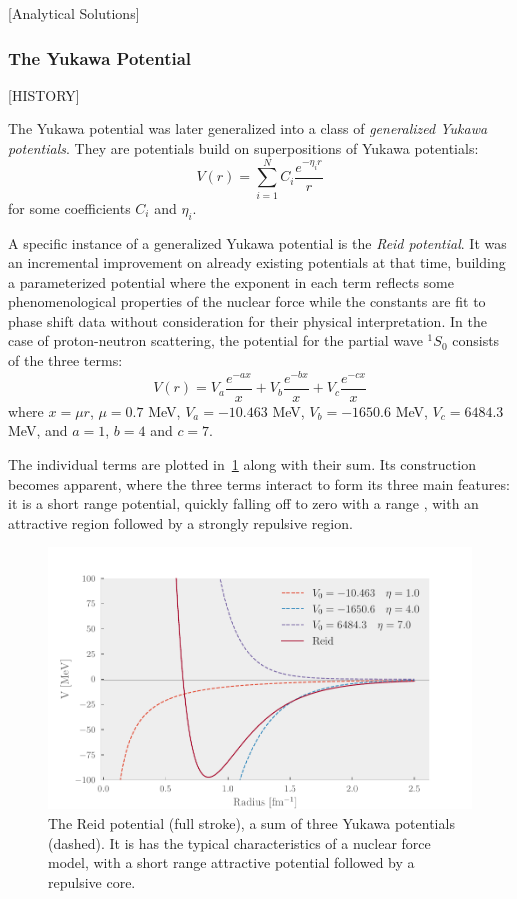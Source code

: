 [Analytical Solutions]


\subsubsection{The Yukawa Potential}
[HISTORY]

The Yukawa potential was later generalized into a class of \textit{generalized
  Yukawa potentials}. They are potentials build on superpositions of Yukawa potentials:
\begin{equation*}
  V(r) = \sum_{i=1}^{N}C_{i}\frac{e^{-\eta_{i}r}}{r}
\end{equation*}
for some coefficients \(C_{i}\) and \(\eta_{i}\).

A specific instance of a generalized Yukawa potential is the \textit{Reid
  potential}\cite{reid}. It was an incremental improvement on already existing potentials
at that time, building a parameterized potential where the exponent in each term reflects some
phenomenological properties of the nuclear force while the constants are fit to
phase shift data without consideration for their physical interpretation.
In the case of proton-neutron scattering, the potential for the partial wave
\(^{1}S_{0}\) consists of the three terms:
\begin{equation*}
  V(r) = V_{a}\frac{e^{-ax}}{x} + V_{b}\frac{e^{-bx}}{x} + V_{c}\frac{e^{-cx}}{x}
\end{equation*}
where \(x=\mu r\), \(\mu=0.7\) MeV, \(V_{a}=-10.463\) MeV, \(V_{b}=-1650.6\)
MeV, \(V_{c}=6484.3\) MeV, and \(a=1\), \(b=4\) and \(c=7\).

The individual terms are plotted in~\cref{fig:reid} along with their sum. Its
construction becomes apparent, where the three terms interact to form its three
main features: it is a short range potential, quickly falling off to zero with a
range , with
an attractive region followed by a strongly repulsive region.

\begin{figure}[ht]
  \centering
  \includegraphics[]{Figures/reid.pdf}
  \caption{\label{fig:reid} The Reid potential (full stroke), a sum of three Yukawa potentials
  (dashed). It is has the typical characteristics of a nuclear force model, with
  a short range attractive potential followed by a repulsive core.}
\end{figure}

